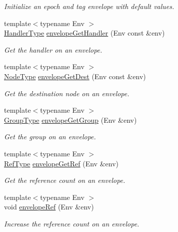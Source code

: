 \begin{DoxyCompactItemize}
\begin{DoxyCompactList}\small\item\em Initialize an epoch and tag envelope with default values. \end{DoxyCompactList}\item 
{\footnotesize template$<$typename Env $>$ }\\\hyperlink{namespacevt_af64846b57dfcaf104da3ef6967917573}{Handler\+Type} \hyperlink{namespacevt_ad3c1fff07670b717ba492d97e9eecc48}{envelope\+Get\+Handler} (Env const \&env)
\begin{DoxyCompactList}\small\item\em Get the handler on an envelope. \end{DoxyCompactList}\item 
{\footnotesize template$<$typename Env $>$ }\\\hyperlink{namespacevt_a866da9d0efc19c0a1ce79e9e492f47e2}{Node\+Type} \hyperlink{namespacevt_a99cdbbb47f13203e14b01fa43bca99e9}{envelope\+Get\+Dest} (Env const \&env)
\begin{DoxyCompactList}\small\item\em Get the destination node on an envelope. \end{DoxyCompactList}\item 
{\footnotesize template$<$typename Env $>$ }\\\hyperlink{namespacevt_a27b5e4411c9b6140c49100e050e2f743}{Group\+Type} \hyperlink{namespacevt_a76b9bdf05b27d6470bac66186c32d9eb}{envelope\+Get\+Group} (Env \&env)
\begin{DoxyCompactList}\small\item\em Get the group on an envelope. \end{DoxyCompactList}\item 
{\footnotesize template$<$typename Env $>$ }\\\hyperlink{namespacevt_a9b39ce9494bb04674d0d5b895a5aa50f}{Ref\+Type} \hyperlink{namespacevt_ad664e6e94c1ea309344adad1c3fb291c}{envelope\+Get\+Ref} (Env \&env)
\begin{DoxyCompactList}\small\item\em Get the reference count on an envelope. \end{DoxyCompactList}\item 
{\footnotesize template$<$typename Env $>$ }\\void \hyperlink{namespacevt_a68c41bd1b8addd0f8feea15a61d5c372}{envelope\+Ref} (Env \&env)
\begin{DoxyCompactList}\small\item\em Increase the reference count on an envelope. \end{DoxyCompactList}\item 

\end{DoxyCompactItemize}
